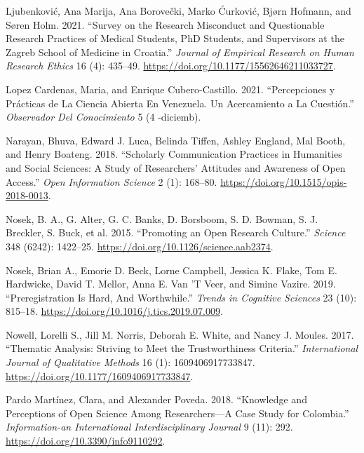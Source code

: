 \documentclass[
  letterpaper,
]{article}
\newlength{\cslhangindent}
\newenvironment{CSLReferences}[2] %
 {\begin{list}{}{%
  \setlength{\itemindent}{0pt}
  \setlength{\leftmargin}{0pt}
  \setlength{\parsep}{0pt}
  \ifodd #1
   \setlength{\leftmargin}{\cslhangindent}
   \setlength{\itemindent}{-1\cslhangindent}
  \fi
  \setlength{\itemsep}{#2\baselineskip}}}
 {\end{list}}
\begin{document}
\begin{CSLReferences}{1}{0}
Ljubenković, Ana Marija, Ana Borovečki, Marko Ćurković, Bjørn Hofmann,
and Søren Holm. 2021. {``Survey on the {Research Misconduct} and
{Questionable Research Practices} of {Medical Students}, {PhD Students},
and {Supervisors} at the {Zagreb School} of {Medicine} in {Croatia}.''}
\emph{Journal of Empirical Research on Human Research Ethics} 16 (4):
435--49. \url{https://doi.org/10.1177/15562646211033727}.

Lopez Cardenas, Maria, and Enrique Cubero-Castillo. 2021.
{``Percepciones y Pr{á}cticas de La Ciencia Abierta En {Venezuela}. {Un}
Acercamiento a La Cuesti{ó}n.''} \emph{Observador Del Conocimiento} 5 (4
-diciemb).

Narayan, Bhuva, Edward J. Luca, Belinda Tiffen, Ashley England, Mal
Booth, and Henry Boateng. 2018. {``Scholarly {Communication Practices}
in {Humanities} and {Social Sciences}: {A Study} of {Researchers}'
{Attitudes} and {Awareness} of {Open Access}.''} \emph{Open Information
Science} 2 (1): 168--80. \url{https://doi.org/10.1515/opis-2018-0013}.

Nosek, B. A., G. Alter, G. C. Banks, D. Borsboom, S. D. Bowman, S. J.
Breckler, S. Buck, et al. 2015. {``Promoting an Open Research
Culture.''} \emph{Science} 348 (6242): 1422--25.
\url{https://doi.org/10.1126/science.aab2374}.

Nosek, Brian A., Emorie D. Beck, Lorne Campbell, Jessica K. Flake, Tom
E. Hardwicke, David T. Mellor, Anna E. Van 'T Veer, and Simine Vazire.
2019. {``Preregistration {Is Hard}, {And Worthwhile}.''} \emph{Trends in
Cognitive Sciences} 23 (10): 815--18.
\url{https://doi.org/10.1016/j.tics.2019.07.009}.

Nowell, Lorelli S., Jill M. Norris, Deborah E. White, and Nancy J.
Moules. 2017. {``Thematic {Analysis}: {Striving} to {Meet} the
{Trustworthiness Criteria}.''} \emph{International Journal of
Qualitative Methods} 16 (1): 1609406917733847.
\url{https://doi.org/10.1177/1609406917733847}.

Pardo Martínez, Clara, and Alexander Poveda. 2018. {``Knowledge and
{Perceptions} of {Open Science} Among {Researchers}---{A Case Study} for
{Colombia}.''} \emph{Information-an International Interdisciplinary
Journal} 9 (11): 292. \url{https://doi.org/10.3390/info9110292}.


\end{CSLReferences}
\end{document}
